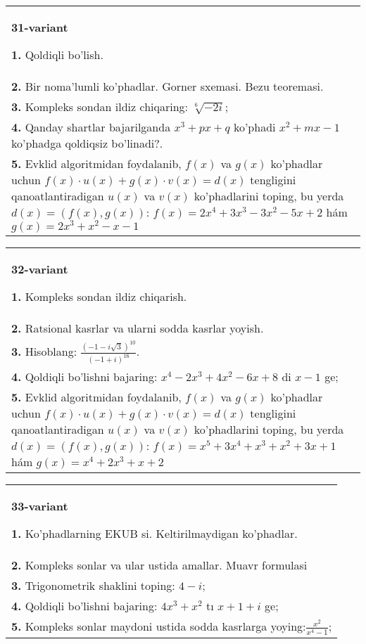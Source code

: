 \documentclass{article}
\begin{document}
\begin{tabular}{m{17cm}}
\textbf{31-variant}
\newline

\textbf{1.} Qoldiqli bo’lish.  \\
\textbf{2.} Bir noma’lumli ko’phadlar. Gorner sxemasi. Bezu teoremasi.  \\
\textbf{3.} Kompleks sondan ildiz chiqaring: $\sqrt[6]{-2 i}$; \\
\textbf{4.} Qanday shartlar bajarilganda $x^3+p x+q$ ko’phadi $x^2+m x-1$ ko’phadga qoldiqsiz bo’linadi?. \\
\textbf{5.} Evklid algoritmidan foydalanib, $f(x)$ va $g(x)$ ko’phadlar uchun $f(x) \cdot u(x)+g(x) \cdot v(x)=d(x)$ tengligini qanoatlantiradigan $u(x)$ va $v(x)$ ko’phadlarini toping, bu yerda $d(x)=(f(x), g(x))$:  $f(x)=2 x^4+3 x^3-3 x^2-5 x+2$ hám $g(x)=2 x^3+x^2-x-1$ \\

\end{tabular}
\vspace{1cm}


\begin{tabular}{m{17cm}}
\textbf{32-variant}
\newline

\textbf{1.} Kompleks sondan ildiz chiqarish. \\
\textbf{2.} Ratsional kasrlar va ularni sodda kasrlar yoyish. \\
\textbf{3.} Hisoblang:  $\frac{(-1-i \sqrt{3})^{10}}{(-1+i)^{16}}$. \\
\textbf{4.} Qoldiqli bo’lishni bajaring: $x^4-2 x^3+4 x^2-6 x+8$ di $x-1$ ge; \\
\textbf{5.} Evklid algoritmidan foydalanib, $f(x)$ va $g(x)$ ko’phadlar uchun $f(x) \cdot u(x)+g(x) \cdot v(x)=d(x)$ tengligini qanoatlantiradigan $u(x)$ va $v(x)$ ko’phadlarini toping, bu yerda $d(x)=(f(x), g(x))$:  $f(x)=x^5+3 x^4+x^3+x^2+3 x+1$ hám $g(x)=x^4+2 x^3+x+2$ \\

\end{tabular}
\vspace{1cm}


\begin{tabular}{m{17cm}}
\textbf{33-variant}
\newline

\textbf{1.} Ko’phadlarning EKUB si. Keltirilmaydigan ko’phadlar. \\
\textbf{2.} Kompleks sonlar va ular ustida amallar. Muavr formulasi  \\
\textbf{3.} Trigonometrik shaklini toping: $4-i$; \\
\textbf{4.} Qoldiqli bo’lishni bajaring: $4 x^3+x^2$ tı $x+1+i$ ge; \\
\textbf{5.} Kompleks sonlar maydoni ustida sodda kasrlarga yoying:$\frac{x^2}{x^4-1}$; \\

\end{tabular}
\vspace{1cm}
\end{document}
